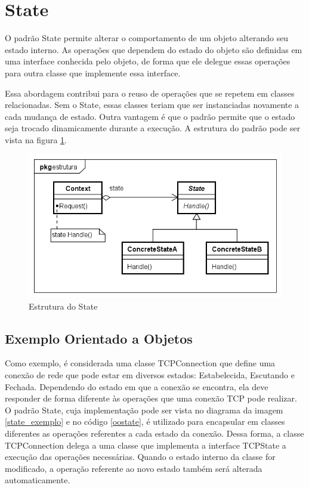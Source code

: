 \section{State}

O padrão State permite alterar o comportamento de um objeto 
alterando seu estado interno. As operações que dependem do 
estado do objeto são definidas em uma interface conhecida 
pelo objeto, de forma que ele delegue essas operações 
para outra classe que implemente essa interface.\cite{gamma:1995} 

Essa abordagem contribui para o reuso de operações 
que se repetem em classes relacionadas. Sem o State, 
essas classes teriam que ser instanciadas novamente 
a cada mudança de estado. Outra vantagem é que o 
padrão permite que o estado seja trocado dinamicamente 
durante a execução. A estrutura do padrão pode ser 
vista na figura \ref{state_struct}.

\begin{figure}[htb]
	\caption{\label{state_struct}Estrutura do State}
	\begin{center}
	    \includegraphics[scale=0.5]{5_padroes-contexto-funcional/5.3_comportamentais/5.3.08_state/state_estrutura.png}
	\end{center}
\end{figure}

\subsection*{Exemplo Orientado a Objetos}

Como exemplo, é considerada uma classe TCPConnection 
que define uma conexão de rede que pode estar em diversos 
estados: Estabelecida, Escutando e Fechada. Dependendo 
do estado em que a conexão se encontra, ela deve 
responder de forma diferente às operações que uma 
conexão TCP pode realizar. O padrão State, cuja 
implementação pode ser vista no diagrama da imagem 
\ref{state_exemplo} e no código \ref{oostate}, é 
utilizado para encapsular em classes diferentes as 
operações referentes a cada estado da conexão. 
Dessa forma, a classe TCPConnection delega a uma classe 
que implementa a interface TCPState a execução das 
operações necessárias. Quando o estado interno da classe 
for modificado, a operação referente ao novo estado 
também será alterada automaticamente.

